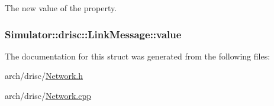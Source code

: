 The new value of the property. 

\hypertarget{struct_simulator_1_1drisc_1_1_link_message_a0fda63d44c5fc4a78baa7881614d41d9}{
\subsubsection[{value}]{ Simulator\+::drisc\+::\+Link\+Message\+::value}}\label{struct_simulator_1_1drisc_1_1_link_message_a0fda63d44c5fc4a78baa7881614d41d9}


The documentation for this struct was generated from the following files\+:\begin{DoxyCompactItemize}
\item 
arch/drisc/\hyperlink{_network_8h}{Network.\+h}\item 
arch/drisc/\hyperlink{_network_8cpp}{Network.\+cpp}\end{DoxyCompactItemize}
